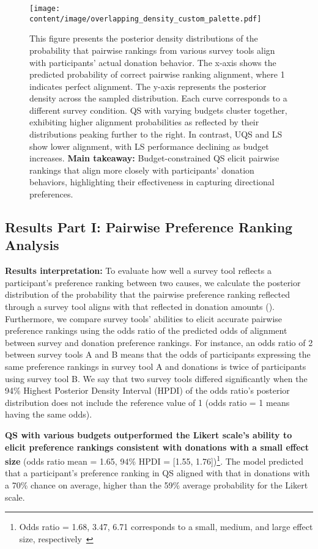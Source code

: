 \begin{figure}[h]
    \centering
    \texttt{[image: content/image/overlapping\_density\_custom\_palette.pdf]}
    \caption{
    This figure presents the posterior density distributions of the probability that pairwise rankings from various survey tools align with participants' actual donation behavior. The x-axis shows the predicted probability of correct pairwise ranking alignment, where 1 indicates perfect alignment. The y-axis represents the posterior density across the sampled distribution. Each curve corresponds to a different survey condition. QS with varying budgets cluster together, exhibiting higher alignment probabilities as reflected by their distributions peaking further to the right. In contrast, UQS and LS show lower alignment, with LS performance declining as budget increases. \textbf{Main takeaway:} Budget-constrained QS elicit pairwise rankings that align more closely with participants' donation behaviors, highlighting their effectiveness in capturing directional preferences.}
    \label{fig:ranking_posterior}
\end{figure}

\subsection{Results Part I: Pairwise Preference Ranking Analysis}
\label{sec:result_1}

\textbf{Results interpretation: }To evaluate how well a survey tool reflects a participant's preference ranking between two causes, we calculate the posterior distribution of the probability that the pairwise preference ranking reflected through a survey tool aligns with that reflected in donation amounts (). Furthermore, we compare survey tools' abilities to elicit accurate pairwise preference rankings using the odds ratio of the predicted odds of alignment between survey and donation preference rankings. For instance, an odds ratio of 2 between survey tools A and B means that the odds of participants expressing the same preference rankings in survey tool A and donations is twice of participants using survey tool B. We say that two survey tools differed significantly when the 94\% Highest Posterior Density Interval (HPDI) of the odds ratio's posterior distribution does not include the reference value of 1 (odds ratio = 1 means having the same odds). 

\textbf{QS with various budgets outperformed the Likert scale's ability to elicit preference rankings consistent with donations with a small effect size} (odds ratio mean = 1.65, 94\% HPDI = [1.55, 1.76])\footnote{Odds ratio = 1.68, 3.47, 6.71 corresponds to a small, medium, and large effect size, respectively~\cite{chen2010big}}. The model predicted that a participant's preference ranking in QS aligned with that in donations with a 70\% chance on average, higher than the 59\% average probability for the Likert scale. 


